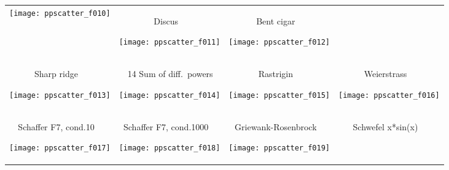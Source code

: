 \documentclass{sig-alternate}
\begin{document}
\begin{figure*}
\begin{tabular}{*{4}{@{}c@{}}}
    \texttt{[image: ppscatter\_f010]}&
\begin{turn}{90}\parbox{0.21\textwidth}{\hfill{} Discus \hfill~}\end{turn} 
    \texttt{[image: ppscatter\_f011]}&
\begin{turn}{90}\parbox{0.21\textwidth}{\hfill{} Bent cigar \hfill~}\end{turn} 
    \texttt{[image: ppscatter\_f012]}\\[-2.2ex]
\begin{turn}{90}\parbox{0.21\textwidth}{\hfill{} Sharp ridge \hfill~}\end{turn} 
    \texttt{[image: ppscatter\_f013]}&
\begin{turn}{90}\parbox{0.21\textwidth}{\hfill\sf~~14 Sum of diff.\ powers \hfill~}\end{turn} 
    \texttt{[image: ppscatter\_f014]}&
\begin{turn}{90}\parbox{0.21\textwidth}{\hfill{} Rastrigin \hfill~}\end{turn} 
    \texttt{[image: ppscatter\_f015]}&
\begin{turn}{90}\parbox{0.21\textwidth}{\hfill{} Weierstrass \hfill~}\end{turn} 
    \texttt{[image: ppscatter\_f016]}\\[-2.2ex]
\begin{turn}{90}\parbox{0.21\textwidth}{\hfill{} Schaffer F7, cond.10 \hfill~}\end{turn} 
    \texttt{[image: ppscatter\_f017]}&
\begin{turn}{90}\parbox{0.21\textwidth}{\hfill{} Schaffer F7, cond.1000 \hfill~}\end{turn} 
    \texttt{[image: ppscatter\_f018]}&
\begin{turn}{90}\parbox{0.21\textwidth}{\hfill{} Griewank-Rosenbrock \hfill~}\end{turn} 
    \texttt{[image: ppscatter\_f019]}&
\begin{turn}{90}\parbox{0.21\textwidth}{\hfill{} Schwefel x*sin(x) \hfill~}\end{turn} 

\end{tabular}
\end{figure*}
\end{document}
